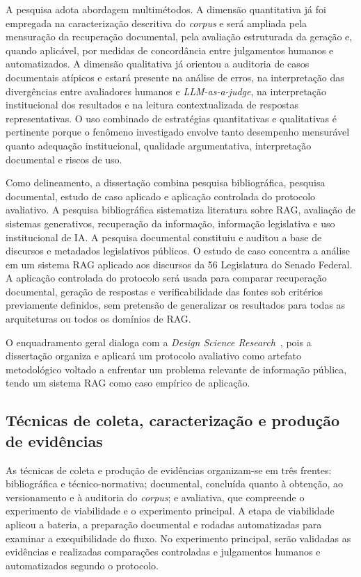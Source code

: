 A pesquisa adota abordagem multimétodos. A dimensão quantitativa já foi empregada na caracterização descritiva do \textit{corpus} e será ampliada pela mensuração da recuperação documental, pela avaliação estruturada da geração e, quando aplicável, por medidas de concordância entre julgamentos humanos e automatizados. A dimensão qualitativa já orientou a auditoria de casos documentais atípicos e estará presente na análise de erros, na interpretação das divergências entre avaliadores humanos e \textit{LLM-as-a-judge}, na interpretação institucional dos resultados e na leitura contextualizada de respostas representativas. O uso combinado de estratégias quantitativas e qualitativas é pertinente porque o fenômeno investigado envolve tanto desempenho mensurável quanto adequação institucional, qualidade argumentativa, interpretação documental e riscos de uso.

Como delineamento, a dissertação combina pesquisa bibliográfica, pesquisa documental, estudo de caso aplicado e aplicação controlada do protocolo avaliativo. A pesquisa bibliográfica sistematiza literatura sobre RAG, avaliação de sistemas generativos, recuperação da informação, informação legislativa e uso institucional de IA. A pesquisa documental constituiu e auditou a base de discursos e metadados legislativos públicos. O estudo de caso concentra a análise em um sistema RAG aplicado aos discursos da 56\textordfeminine{} Legislatura do Senado Federal. A aplicação controlada do protocolo será usada para comparar recuperação documental, geração de respostas e verificabilidade das fontes sob critérios previamente definidos, sem pretensão de generalizar os resultados para todas as arquiteturas ou todos os domínios de RAG.

O enquadramento geral dialoga com a \textit{Design Science Research}~\parencite{hevnerEtAl2004designScience,peffersEtAl2007dsrm}, pois a dissertação organiza e aplicará um protocolo avaliativo como artefato metodológico voltado a enfrentar um problema relevante de informação pública, tendo um sistema RAG como caso empírico de aplicação.

\subsection{Técnicas de coleta, caracterização e produção de evidências}

As técnicas de coleta e produção de evidências organizam-se em três frentes: bibliográfica e técnico-normativa; documental, concluída quanto à obtenção, ao versionamento e à auditoria do \textit{corpus}; e avaliativa, que compreende o experimento de viabilidade e o experimento principal. A etapa de viabilidade aplicou a bateria, a preparação documental e rodadas automatizadas para examinar a exequibilidade do fluxo. No experimento principal, serão validadas as evidências e realizadas comparações controladas e julgamentos humanos e automatizados segundo o protocolo.

